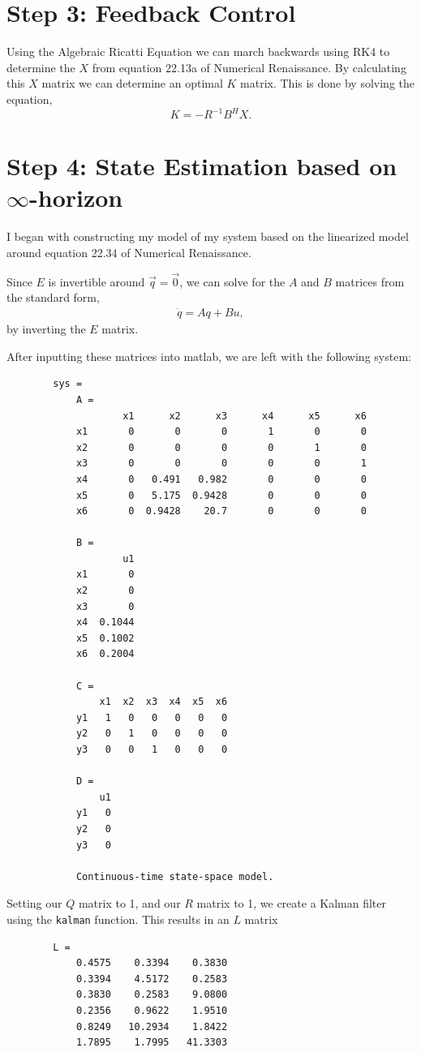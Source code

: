 \documentclass{article}
\theoremstyle{definition}
\begin{document}
    \section*{Step 3: Feedback Control}
    Using the Algebraic Ricatti Equation we can march backwards using RK4 to 
    determine the $X$ from equation 22.13a of Numerical Renaissance. 
    By calculating this $X$ matrix we can determine an optimal $K$ matrix. 
    This is done by solving the equation,
    \begin{equation*}
        K = -R^{-1} B^H X.
    \end{equation*}

    \section*{Step 4: State Estimation based on $\infty$-horizon}
    I began with constructing my model of my system based on the linearized
    model around equation 22.34 of Numerical Renaissance. 

    Since $E$ is invertible around $\vec q = \vec 0$, we can solve for 
    the $A$ and $B$ matrices from the standard form,
    \begin{eqnarray*}
        \dot q = A q + B u,
    \end{eqnarray*}
    by inverting the $E$ matrix. 

    After inputting these matrices into matlab, we are left with the following system:
    \begin{verbatim}
        sys =
            A = 
                    x1      x2      x3      x4      x5      x6
            x1       0       0       0       1       0       0
            x2       0       0       0       0       1       0
            x3       0       0       0       0       0       1
            x4       0   0.491   0.982       0       0       0
            x5       0   5.175  0.9428       0       0       0
            x6       0  0.9428    20.7       0       0       0
            
            B = 
                    u1
            x1       0
            x2       0
            x3       0
            x4  0.1044
            x5  0.1002
            x6  0.2004
            
            C = 
                x1  x2  x3  x4  x5  x6
            y1   1   0   0   0   0   0
            y2   0   1   0   0   0   0
            y3   0   0   1   0   0   0
            
            D = 
                u1
            y1   0
            y2   0
            y3   0
            
            Continuous-time state-space model.
    \end{verbatim}
    Setting our $Q$ matrix to 1, and our $R$ matrix to 1,
    we create a Kalman filter using the \texttt{kalman} function.
    This results in an $L$ matrix 
    \begin{verbatim}
        L =
            0.4575    0.3394    0.3830
            0.3394    4.5172    0.2583
            0.3830    0.2583    9.0800
            0.2356    0.9622    1.9510
            0.8249   10.2934    1.8422
            1.7895    1.7995   41.3303
    \end{verbatim}
\end{document}

